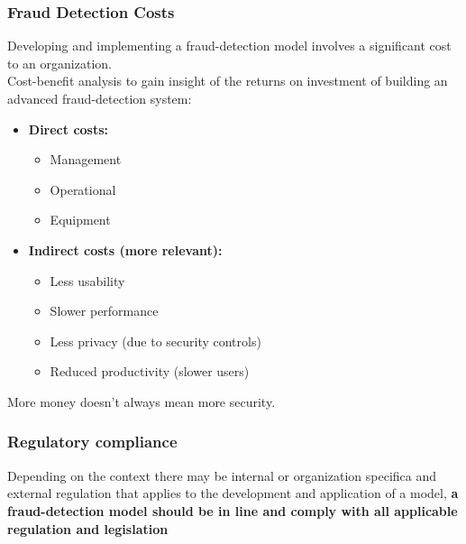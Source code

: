         \subsubsection{Fraud Detection Costs}
            Developing and implementing a fraud-detection model involves a significant cost to an organization.\\
            Cost-benefit analysis to gain insight of the returns on investment of building an advanced fraud-detection system:
            \begin{itemize}
                \item \textbf{Direct costs:}
                \begin{itemize}
                    \item Management
                    \item Operational
                    \item Equipment
                \end{itemize}
                \item \textbf{Indirect costs (more relevant):}
                \begin{itemize}
                    \item Less usability
                    \item Slower performance
                    \item Less privacy (due to security controls)
                    \item Reduced productivity (slower users)
                \end{itemize}
            \end{itemize}
            More money doesn't always mean more security.
        \subsubsection{Regulatory compliance}
            Depending on the context there may be internal or organization specifica and external regulation that applies to the development and application of a model, \textbf{a fraud-detection model should be in line and comply with all applicable regulation and legislation} 